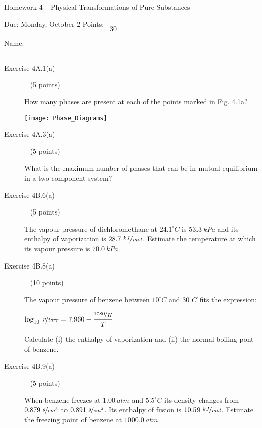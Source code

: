 \documentclass[12pt, openany, letterpaper]{memoir}
\begin{document}
\begin{center}
	{\large Homework 4 -- Physical Transformations of Pure Substances}
	
	Due: Monday, October 2 \hspace{3em} Points: ${\dfrac{~}{~~30~~}}$
\end{center}

Name: \rule[-.1mm]{15em}{0.1pt}

\begin{description}	
	\item [Exercise 4A.1(a)] ~ (5 points)
	
	How many phases are present at each of the points marked in Fig. 4.1a?
	
	\noindent\texttt{[image: Phase\_Diagrams]}
	\item [Exercise 4A.3(a)] ~ (5 points)
	
	What is the maximum number of phases that can be in mutual equilibrium in a two-component system?
	
	\vspace{10em}
	\item [Exercise 4B.6(a)] ~ (5 points)
	
	The vapour pressure of dichloromethane at $24.1^\circ C$ is $53.3~kPa$ and its enthalpy of vaporization is $28.7~\nicefrac{kJ}{mol}$. Estimate the temperature at which its vapour pressure is $70.0~kPa$.
	

	
	\vspace{10em}
	\item [Exercise 4B.8(a)] ~ (10 points)
	
	The vapour pressure of benzene between $10^\circ C$ and $30^\circ C$ fits the expression:
	
	 $\log_{10}~\nicefrac{p}{torr} = 7.960-\dfrac{\nicefrac{1780}{K}}{T}$ 
	 
	 Calculate (i) the enthalpy of vaporization and (ii) the normal boiling pont of benzene.
	
	\vspace{20em}
	\item [Exercise 4B.9(a)] ~ (5 points)
	
	When benzene freezes at $1.00~atm$ and $5.5^\circ C$ its density changes from $0.879~\nicefrac{g}{cm^3}$ to $0.891~\nicefrac{g}{cm^3}$. Its enthalpy of fusion is $10.59~\nicefrac{kJ}{mol}$. Estimate the freezing point of benzene at $1000.0~atm$.
	
	\vspace{15em}	
\end{description}
\end{document}
